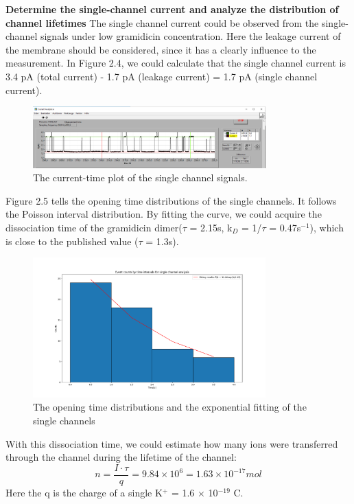 \documentclass[a4paper,english,12pt,bibliography=totoc]{scrreprt}
\begin{document}
\textbf{Determine the single-channel current and analyze the distribution of channel
lifetimes}
The single channel current could be observed from the single-channel signals under low gramidicin concentration. Here the leakage current of the membrane should be considered, since it has a clearly influence to the measurement. In Figure 2.4, we could calculate that the single channel current is 3.4 pA (total current) - 1.7 pA (leakage current) = 1.7 pA (single channel current).
\begin{figure}[H]
    \centering
    \includegraphics[width = 0.8\textwidth]{Group 8/Single Channel Current.PNG}
    \caption{The current-time plot of the single channel signals.}
    \label{fig:enter-label}
\end{figure}

Figure 2.5 tells the opening time distributions of the single channels. It follows the Poisson interval distribution. By fitting the curve, we could acquire the dissociation time of the gramidicin dimer($\tau$ = 2.15s, k$_D$ = 1/$\tau$ = 0.47s$^{-1}$), which is close to the published value ($\tau$ = 1.3s)\cite{dis_time}.
\begin{figure}[H]
    \centering
    \includegraphics[width = 0.8\textwidth]{Group 8/poission.png}
    \caption{The opening time distributions and the exponential fitting of the single channels}
    \label{fig:enter-label}
\end{figure}

With this dissociation time, we could estimate how many ions were transferred through the channel during the lifetime of the channel:
\begin{equation}
    n = \frac{I \cdot \tau}{q} = 9.84\times 10^6 = 1.63 \times 10^{-17} mol
\end{equation}
Here the q is the charge of a single K$^+$ = 1.6 $\times$ 10$^{-19}$ C.\\
\end{document}
